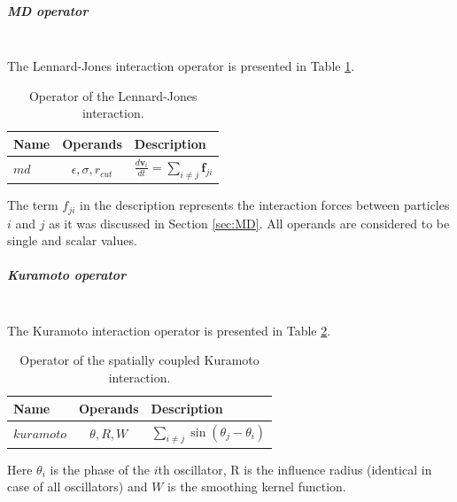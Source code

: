 \documentclass[a4paper,12pt,openany]{book}
\newcommand{\mysubparagraph}[1]{\subparagraph{#1}\mbox{}\\}
\theoremstyle{break}
\begin{document}
\mysubparagraph{MD operator}
The Lennard-Jones interaction operator is presented in Table \ref{tbl:MD_op}.
\begin{table} [h!]
\begin{center}
\caption{Operator of the Lennard-Jones interaction.} \label{tbl:MD_op}
\begin{tabular}{ l c l }
\toprule[1.5pt]
\bf Name & \bf Operands & \bf Description \\ 
\midrule
$md$ & $\epsilon, \sigma, r_{cut}$ & $\frac{d\textbf{v}_i}{dt}=\sum_{i\neq j}{\textbf{f}_{ji}}$ \\
\bottomrule[1.25pt]
\end{tabular}
\end{center}
\end{table}
The term $f_{ji}$ in the description represents the interaction forces between particles $i$ and $j$ as it was discussed in Section \ref{sec:MD}. All operands are considered to be single and scalar values.

\mysubparagraph{Kuramoto operator}
The Kuramoto interaction operator is presented in Table \ref{tbl:kuramoto_op}.
\begin{table} [h!]
\begin{center}
\caption{Operator of the spatially coupled Kuramoto interaction.} \label{tbl:kuramoto_op}
\begin{tabular}{ l c l }
\toprule[1.5pt]
\bf Name & \bf Operands & \bf Description \\ 
\midrule
$kuramoto$ & $\theta, R, W$ & $\sum_{i\neq j}{\sin(\theta_j-\theta_i)}$ \\
\bottomrule[1.25pt]
\end{tabular}
\end{center}
\end{table}
Here $\theta_i$ is the phase of the $i$th oscillator, R is the influence radius (identical in case of all oscillators) and $W$ is the smoothing kernel function.
\end{document}
